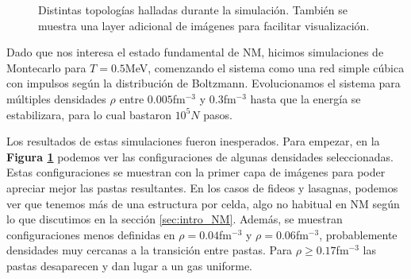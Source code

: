 \begin{figure}[H]
	\centering
	\hspace{0.03\columnwidth}
	\hspace{0.03\columnwidth}
	\hspace{0.03\columnwidth}
	\hspace{0.03\columnwidth}
	\hspace{0.03\columnwidth}
	\hspace{0.03\columnwidth}
	\caption{Distintas topologías halladas durante la simulación.
	También se muestra una layer adicional de imágenes para facilitar visualización.}
	\label{fig:pastas_x1}
\end{figure}

Dado que nos interesa el estado fundamental de NM, hicimos simulaciones de Montecarlo para $T=0.5$MeV, comenzando el sistema como una red simple cúbica con impulsos según la distribución de Boltzmann.
Evolucionamos el sistema para múltiples densidades $\rho$ entre $0.005$fm$^{-3}$ y $0.3$fm$^{-3}$ hasta que la energía se estabilizara, para lo cual bastaron $10^5N$ pasos.

Los resultados de estas simulaciones fueron inesperados.
Para empezar, en la \textbf{Figura \ref{fig:pastas_x1}} podemos ver las configuraciones de algunas densidades seleccionadas.
Estas configuraciones se muestran con la primer capa de imágenes para poder apreciar mejor las pastas resultantes.
En los casos de fideos y lasagnas, podemos ver que tenemos más de una estructura por celda, algo no habitual en NM según lo que discutimos en la sección \ref{sec:intro_NM}.
Además, se muestran configuraciones menos definidas en $\rho=0.04$fm$^{-3}$ y $\rho=0.06$fm$^{-3}$, probablemente densidades muy cercanas a la transición entre pastas.
Para $\rho\geq 0.17$fm$^{-3}$ las pastas desaparecen y dan lugar a un gas uniforme. 

